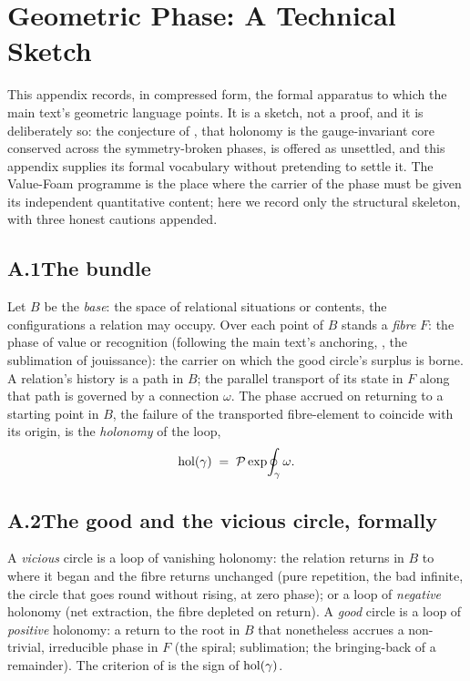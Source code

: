 \appendix
\section{Geometric Phase: A Technical Sketch}
\label{p10:app:phase}

\noindent
This appendix records, in compressed form, the formal apparatus to which the main text's geometric language points. It is a sketch, not a proof, and it is deliberately so: the conjecture of , that holonomy is the gauge-invariant core conserved across the symmetry-broken phases, is offered as unsettled, and this appendix supplies its formal vocabulary without pretending to settle it. The Value-Foam programme is the place where the carrier of the phase must be given its independent quantitative content; here we record only the structural skeleton, with three honest cautions appended.

\subsection*{A.1\quad The bundle}
Let $B$ be the \emph{base}: the space of relational situations or contents, the configurations a relation may occupy. Over each point of $B$ stands a \emph{fibre} $F$: the phase of value or recognition (following the main text's anchoring, , the sublimation of jouissance): the carrier on which the good circle's surplus is borne. A relation's history is a path in $B$; the parallel transport of its state in $F$ along that path is governed by a connection $\omega$. The phase accrued on returning to a starting point in $B$, the failure of the transported fibre-element to coincide with its origin, is the \emph{holonomy} of the loop,
\[
\operatorname{hol}(\gamma) \;=\; \mathcal{P}\exp\!\oint_\gamma \omega .
\]

\subsection*{A.2\quad The good and the vicious circle, formally}
A \emph{vicious} circle is a loop of vanishing holonomy: the relation returns in $B$ to where it began and the fibre returns unchanged (pure repetition, the bad infinite, the circle that goes round without rising, at zero phase); or a loop of \emph{negative} holonomy (net extraction, the fibre depleted on return). A \emph{good} circle is a loop of \emph{positive} holonomy: a return to the root in $B$ that nonetheless accrues a non-trivial, irreducible phase in $F$ (the spiral; sublimation; the bringing-back of a remainder). The criterion of  is the sign of $\operatorname{hol}(\gamma)$.

